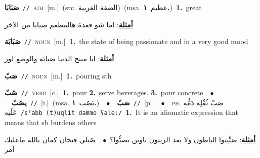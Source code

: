 \documentclass[10pt,a4paper,twoside]{article} %
\begin{document}
\begin{multicols}{2}
{{{\setlength\topsep{0pt}\textbf{\foreignlanguage{arabic}{صَبَابَا}}\ {\color{gray}\texttt{//}\color{black}}\ \textsc{adj}\ [m.]\ (src. \color{gray}\foreignlanguage{arabic}{الضفة الغربية}\color{black})\ \color{gray}(msa. \foreignlanguage{arabic}{عظيم}~\foreignlanguage{arabic}{\textbf{١.}})\color{black}\ \textbf{1.}~great\  \begin{flushright}\color{gray}\foreignlanguage{arabic}{\textbf{\underline{\foreignlanguage{arabic}{أمثلة}}}: اما شو قعدة هالمطعم صبابا من الاخر}\end{flushright}\color{black}} \vspace{2mm}

{\setlength\topsep{0pt}\textbf{\foreignlanguage{arabic}{صَبَابَة}}\ {\color{gray}\texttt{//}\color{black}}\ \textsc{noun}\ [m.]\ \textbf{1.}~the state of being passionate and in a very good mood\  \begin{flushright}\color{gray}\foreignlanguage{arabic}{\textbf{\underline{\foreignlanguage{arabic}{أمثلة}}}: انا منيح الدنيا صَبابَة والوضع لوز}\end{flushright}\color{black}} \vspace{2mm}

{\setlength\topsep{0pt}\textbf{\foreignlanguage{arabic}{صَبّ}}\ {\color{gray}\texttt{//}\color{black}}\ \textsc{noun}\ [m.]\ \textbf{1.}~pouring sth\ 

{\setlength\topsep{0pt}\textbf{\foreignlanguage{arabic}{صُبّ}}\ {\color{gray}\texttt{//}\color{black}}\ \textsc{verb}\ [c.]\ \textbf{1.}~pour  \textbf{2.}~serve beverages.  \textbf{3.}~pour concrete\ \ $\bullet$\ \ \setlength\topsep{0pt}\textbf{\foreignlanguage{arabic}{يصُبّ}}\ {\color{gray}\texttt{//}\color{black}}\ [i.]\ \color{gray}(msa. \foreignlanguage{arabic}{يَصُب}~\foreignlanguage{arabic}{\textbf{١.}})\color{black}\ \ $\bullet$\ \ \setlength\topsep{0pt}\textbf{\foreignlanguage{arabic}{صَبّ}}\ {\color{gray}\texttt{//}\color{black}}\ [p.]\ \ $\bullet$\ \ \textsc{ph.} \color{gray} \foreignlanguage{arabic}{صَبّ ثُقْلِة دَمُّه عَلَيه}\color{black}\ {\color{gray}\texttt{/{\sffamily sˤabb (t)uqlit dammo ʕaleː}/}\color{black}}\ \textbf{1.}~It is an idiomatic expression that means that sb burdens others\  \begin{flushright}\color{gray}\foreignlanguage{arabic}{\textbf{\underline{\foreignlanguage{arabic}{أمثلة}}}: صَبِّيتوا الباطون ولا يعد الزيتون ناوين تصبُّوا؟\ $\bullet$\ \  صُبلي فنجان كمان بالله ماعليك أمر}\end{flushright}\color{black}} \vspace{2mm}

}}}
\end{multicols}
\end{document}
